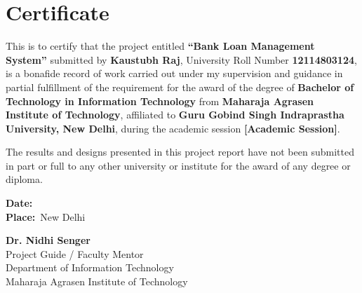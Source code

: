 \chapter*{Certificate}
\thispagestyle{empty}

This is to certify that the project entitled \textbf{``Bank Loan Management System''} submitted by \textbf{Kaustubh Raj}, University Roll Number \textbf{12114803124}, is a bonafide record of work carried out under my supervision and guidance in partial fulfillment of the requirement for the award of the degree of \textbf{Bachelor of Technology in Information Technology} from \textbf{Maharaja Agrasen Institute of Technology}, affiliated to \textbf{Guru Gobind Singh Indraprastha University, New Delhi}, during the academic session \textbf{[Academic Session]}.

The results and designs presented in this project report have not been submitted in part or full to any other university or institute for the award of any degree or diploma.

\vspace{2.5cm}

\noindent
\begin{minipage}{0.45\textwidth}
    \textbf{Date:}\ \hrulefill\\[0.5cm]
    \textbf{Place:}\ New Delhi
\end{minipage}
\hfill
\begin{minipage}{0.45\textwidth}
    \begin{flushright}
        \textbf{Dr. Nidhi Senger}\\
        Project Guide / Faculty Mentor\\
        Department of Information Technology\\
        Maharaja Agrasen Institute of Technology
    \end{flushright}
\end{minipage}
